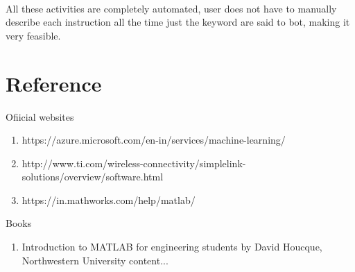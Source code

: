 \documentclass[12pt,a4paper]{article}
\begin{document}
	\paragraph{}
	All these activities are completely automated, user does not have to manually describe each instruction all the time just the keyword are said to bot, making it very feasible.
	\newpage
	\section{Reference}
	Ofiicial websites
	\begin{enumerate}
		\item https://azure.microsoft.com/en-in/services/machine-learning/ 
		\item http://www.ti.com/wireless-connectivity/simplelink-solutions/overview/software.html
		\item https://in.mathworks.com/help/matlab/
	\end{enumerate}
	Books
	\begin{enumerate}
		\item Introduction to MATLAB for engineering students by David Houcque, Northwestern University
		content...
	\end{enumerate}
\end{document}
